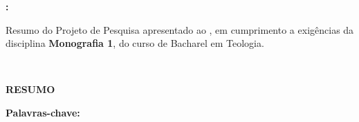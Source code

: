 \documentclass[12pt, openright, oneside, a4paper, english, brazil]{abntex2}
\begin{document}


\newpage
\begin{center}
    \textbf{\MakeUppercase{\imprimirautor}}
    \vskip 5.5cm

    \textbf{\MakeUppercase{\imprimirtitulo}:} \subtema

    \vskip 5.5cm
\end{center}
    \begin{flushright}
        \begin{minipage}{0.55\textwidth}
            Resumo do Projeto de Pesquisa apresentado ao \instituicao, em cumprimento a exigências da disciplina \textbf{Monografia 1}, do curso de Bacharel em Teologia.
        \end{minipage}
    \end{flushright}
    \vskip 3.0cm
\begin{center}
    \vfill
    \imprimirlocal \\
    \imprimirdata
\end{center}

\newpage
\begin{center}
    \large \textbf{RESUMO}
\end{center}

\vspace{1cm}



\vspace{0.5cm}

\noindent
\textbf{Palavras-chave:} \palavrasChave
\end{document}
